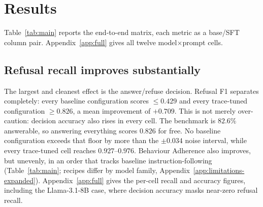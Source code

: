 \section{Results}
\label{sec:results}

Table~\ref{tab:main} reports the end-to-end matrix, each metric as a base/SFT
column pair. Appendix~\ref{app:full} gives all twelve model$\times$prompt cells.

\begin{table}[htbp]
\centering

\caption{\textbf{End-to-end results on the 736-example held-out benchmark.} Within each pair the benchmark, prompts, decoding policy and evaluator are identical. Only the LoRA adapter differs. Bold marks a fine-tuned value that exceeds its baseline. Differences below the $\pm0.034$ noise floor (\S\ref{sec:setup}) are uninformative. We show the two endpoints of the instruction ladder. The intermediate runtime condition is in Appendix~\ref{app:full}.}
\label{tab:main}
\end{table}

\begin{table}[htbp]
\centering

\caption{\textbf{External prompting comparators} on baseline models; trace-tuned rows use the strict prompt, so every row receives a well-specified instruction. Both comparators reach usable answer content but neither acquires the answer/refuse decision.}
\label{tab:comparators}
\end{table}

\subsection{Refusal recall improves substantially}
\label{sec:refusal}

The largest and cleanest effect is the answer/refuse decision. Refusal F1
separates completely: every baseline configuration scores $\leq0.429$ and every
trace-tuned configuration $\geq0.826$, a mean improvement of $+0.709$. This is
not merely over-caution: decision accuracy also rises in every cell. The
benchmark is $82.6\%$ answerable, so answering everything scores $0.826$ for
free. No baseline configuration exceeds that floor by more than the $\pm0.034$
noise interval, while every trace-tuned cell reaches $0.927$--$0.976$.
Behaviour Adherence also improves, but unevenly, in an order that tracks
baseline instruction-following (Table~\ref{tab:main}; recipes differ by model
family, Appendix~\ref{app:limitations-expanded}).
Appendix~\ref{app:full} gives the per-cell recall and accuracy figures,
including the Llama-3.1-8B case, where decision accuracy masks near-zero
refusal recall.

